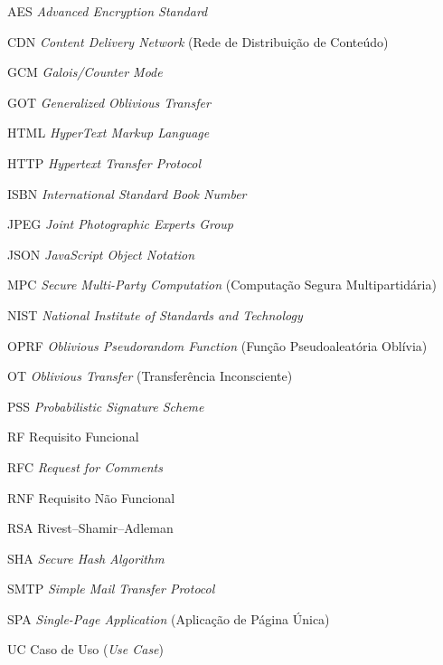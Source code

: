 \documentclass[
	12pt,				%
	openright,			%
	twoside,			%
	a4paper,			%
	english,			%
	french,				%
	spanish,			%
	brazil				%
	]{abntex2}
\begin{document}
\begin{siglas}
  \item[AES] \emph{Advanced Encryption Standard}
  \item[CDN] \emph{Content Delivery Network} (Rede de Distribuição de Conteúdo)
  \item[GCM] \emph{Galois/Counter Mode}
  \item[GOT] \emph{Generalized Oblivious Transfer}
  \item[HTML] \emph{HyperText Markup Language}
  \item[HTTP] \emph{Hypertext Transfer Protocol}
  \item[ISBN] \emph{International Standard Book Number}
  \item[JPEG] \emph{Joint Photographic Experts Group}
  \item[JSON] \emph{JavaScript Object Notation}
  \item[MPC] \emph{Secure Multi-Party Computation} (Computação Segura Multipartidária)
  \item[NIST] \emph{National Institute of Standards and Technology}
  \item[OPRF] \emph{Oblivious Pseudorandom Function} (Função Pseudoaleatória Oblívia)
  \item[OT] \emph{Oblivious Transfer} (Transferência Inconsciente)
  \item[PSS] \emph{Probabilistic Signature Scheme}
  \item[RF] Requisito Funcional
  \item[RFC] \emph{Request for Comments}
  \item[RNF] Requisito Não Funcional
  \item[RSA] Rivest--Shamir--Adleman
  \item[SHA] \emph{Secure Hash Algorithm}
  \item[SMTP] \emph{Simple Mail Transfer Protocol}
  \item[SPA] \emph{Single-Page Application} (Aplicação de Página Única)
  \item[UC] Caso de Uso (\emph{Use Case})
\end{siglas}

\end{document}
